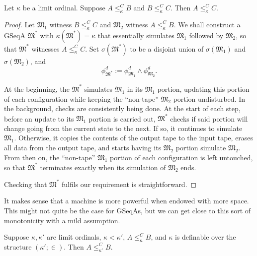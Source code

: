 \documentclass[12pt]{article}
\numberwithin{equation}{section}
\begin{document}
\begin{prop}\label{prop245}
Let $\kappa$ be a limit ordinal. Suppose $A \leq^C_{\kappa} B$ and $B \leq^C_{\kappa} C$. Then $A \leq^C_{\kappa} C$.
\end{prop}

\begin{proof}
Let $\mathfrak{M}_1$ witness $B \leq^C_{\kappa} C$ and $\mathfrak{M}_2$ witness $A \leq^C_{\kappa} B$. We shall construct a GSeqA $\mathfrak{M}^*$ with $\kappa(\mathfrak{M}^*) = \kappa$ that essentially simulates $\mathfrak{M}_1$ followed by $\mathfrak{M}_2$, so that $\mathfrak{M}^*$ witnesses $A \leq^C_{\kappa} C$. Set $\sigma(\mathfrak{M}^*)$ to be a disjoint union of $\sigma(\mathfrak{M}_1)$ and $\sigma(\mathfrak{M}_2)$, and 
\begin{equation*}
    \phi^d_{\mathfrak{M}^*} := \phi^d_{\mathfrak{M}_1} \wedge \phi^d_{\mathfrak{M}_2} \text{.}
\end{equation*}

At the beginning, the $\mathfrak{M}^*$ simulates $\mathfrak{M}_1$ in its $\mathfrak{M}_1$ portion, updating this portion of each configuration while keeping the ``non-tape'' $\mathfrak{M}_2$ portion undisturbed. In the background, checks are consistently being done. At the start of each step, before an update to its $\mathfrak{M}_1$ portion is carried out, $\mathfrak{M}^*$ checks if said portion will change going from the current state to the next. If so, it continues to simulate $\mathfrak{M}_1$. Otherwise, it copies the contents of the output tape to the input tape, erases all data from the output tape, and starts having its $\mathfrak{M}_2$ portion simulate $\mathfrak{M}_2$. From then on, the ``non-tape'' $\mathfrak{M}_1$ portion of each configuration is left untouched, so that $\mathfrak{M}^*$ terminates exactly when its simulation of $\mathfrak{M}_2$ ends.

Checking that $\mathfrak{M}^*$ fulfils our requirement is straightforward.
\end{proof}

It makes sense that a machine is more powerful when endowed with more space. This might not quite be the case for GSeqAs, but we can get close to this sort of monotonicity with a mild assumption.

\begin{prop}\label{prop246}
Suppose $\kappa, \kappa'$ are limit ordinals, $\kappa < \kappa'$, $A \leq^C_{\kappa} B$, and $\kappa$ is definable over the structure $(\kappa'; \in)$. Then $A \leq^C_{\kappa'} B$.
\end{prop}
\end{document}
